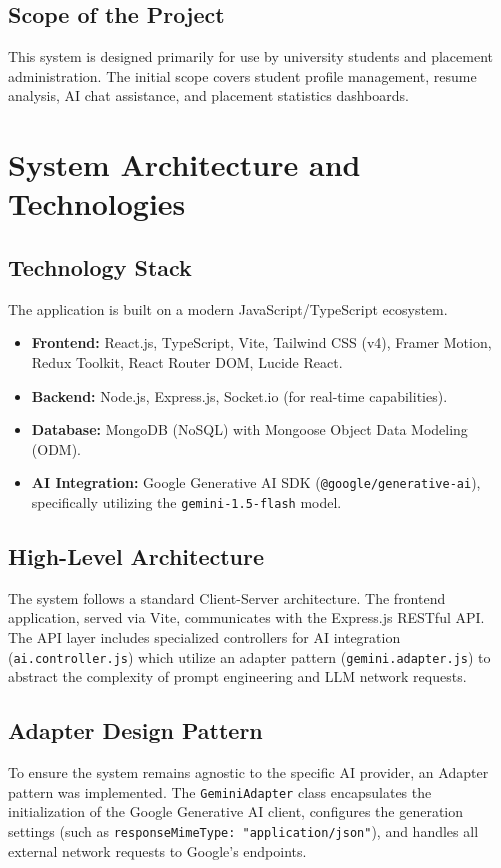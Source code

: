 \documentclass[12pt,a4paper]{report}
\begin{document}
\section{Scope of the Project}
This system is designed primarily for use by university students and placement administration. The initial scope covers student profile management, resume analysis, AI chat assistance, and placement statistics dashboards.

\chapter{System Architecture and Technologies}
\section{Technology Stack}
The application is built on a modern JavaScript/TypeScript ecosystem.
\begin{itemize}
    \item \textbf{Frontend:} React.js, TypeScript, Vite, Tailwind CSS (v4), Framer Motion, Redux Toolkit, React Router DOM, Lucide React.
    \item \textbf{Backend:} Node.js, Express.js, Socket.io (for real-time capabilities).
    \item \textbf{Database:} MongoDB (NoSQL) with Mongoose Object Data Modeling (ODM).
    \item \textbf{AI Integration:} Google Generative AI SDK (\texttt{@google/generative-ai}), specifically utilizing the \texttt{gemini-1.5-flash} model.
\end{itemize}

\section{High-Level Architecture}
The system follows a standard Client-Server architecture. The frontend application, served via Vite, communicates with the Express.js RESTful API. The API layer includes specialized controllers for AI integration (\texttt{ai.controller.js}) which utilize an adapter pattern (\texttt{gemini.adapter.js}) to abstract the complexity of prompt engineering and LLM network requests.

\section{Adapter Design Pattern}
To ensure the system remains agnostic to the specific AI provider, an Adapter pattern was implemented. The \texttt{GeminiAdapter} class encapsulates the initialization of the Google Generative AI client, configures the generation settings (such as \texttt{responseMimeType: "application/json"}), and handles all external network requests to Google's endpoints.
\end{document}
